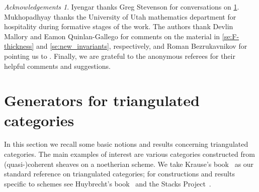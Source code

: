 \documentclass{amsart}
\theoremstyle{definition}
\theoremstyle{remark}
\newtheorem*{ack}{Acknowledgements}
\numberwithin{equation}{subsection}
\begin{document}
\begin{ack}
Iyengar thanks Greg Stevenson for conversations on \cref{se:local-global}. Mukhopadhyay thanks the University of Utah mathematics department for hospitality during formative stages of the work. The authors thank  Devlin Mallory and Eamon Quinlan-Gallego for comments on the material in  \cref{se:F-thickness} and \cref{se:new_invariants}, respectively, and Roman Bezrukavnikov for pointing us to \cite{Bezrukavnikov/Mirkovic/Rumynin:2008}. Finally, we are grateful to the anonymous referees for their helpful comments and suggestions.  
\end{ack}

\section{Generators for triangulated categories}
\label{se:local-global}

In this section we recall some basic notions and results concerning triangulated categories. The main examples of interest are various categories constructed from (quasi-)coherent sheaves on a noetherian scheme. We take Krause's book~\cite{Krause:2022} as our standard reference on triangulated categories; for constructions and results specific to schemes see Huybrecht's book~\cite{Huybrechts:2006} and the Stacks Project~\cite{StacksProject}.
\end{document}
